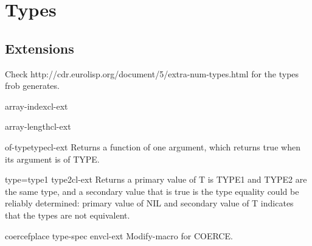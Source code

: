 
\chapter{Types}
\label{cha:types}

\section{Extensions}
\label{sec:extensions}

Check http://cdr.eurolisp.org/document/5/extra-num-types.html for the
types frob generates.

\begin{type}{array-index}{}{cl-ext}{}
  
\end{type}

\begin{type}{array-length}{}{cl-ext}{}
  
\end{type}

\begin{function}{of-type}{type}{cl-ext}{}
  Returns a function of one argument, which returns true when its argument is
of TYPE.
\end{function}

\begin{function}{type=}{type1 type2}{cl-ext}{}
  Returns a primary value of T is TYPE1 and TYPE2 are the same type,
and a secondary value that is true is the type equality could be reliably
determined: primary value of NIL and secondary value of T indicates that the
types are not equivalent.
\end{function}

\begin{macro}{coercef}{place type-spec \env env}{cl-ext}{}
  Modify-macro for COERCE.
\end{macro}

